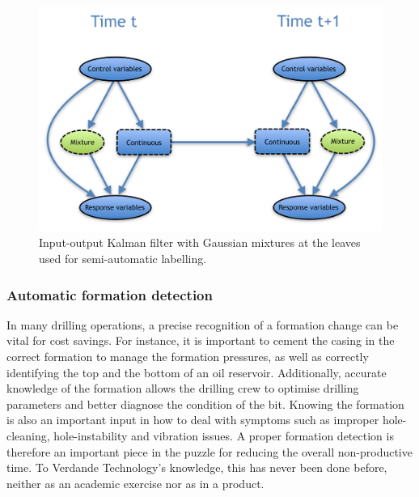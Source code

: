 \begin{figure}[ht!]
\begin{center}
\includegraphics[scale=0.5]{./figures/VT_Scenario2} 
\caption{\label{Figure:VTScenario2}  Input-output Kalman filter with Gaussian mixtures at the leaves used for semi-automatic labelling.}
\end{center}
\end{figure}


\subsubsection{Automatic formation detection}\label{SubSection:DetectionFormation}

In many drilling operations, a precise recognition of a formation change can be vital for cost savings. 
For instance, it is important to cement the casing in the correct formation to manage the formation pressures, as well as correctly identifying the top and the bottom of an oil reservoir. 
Additionally, accurate knowledge of the formation allows the drilling crew to optimise drilling parameters and better diagnose the condition of the bit. 
Knowing the formation is also an important input in how to deal with symptoms such as improper hole-cleaning, hole-instability and vibration issues. 
A proper formation detection is therefore an important piece in the puzzle for reducing the overall non-productive time.  To Verdande Technology's knowledge, this has never been done before, neither as an academic exercise nor as in a product. 

